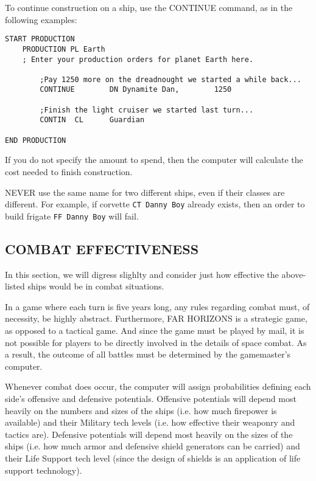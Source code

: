 \documentclass[10pt,titlepage]{article}
\begin{document}
To continue construction on a ship, use the CONTINUE command, as in the
following examples:
\begin{verbatim}
START PRODUCTION
    PRODUCTION PL Earth
    ; Enter your production orders for planet Earth here.

        ;Pay 1250 more on the dreadnought we started a while back...
        CONTINUE        DN Dynamite Dan,        1250

        ;Finish the light cruiser we started last turn...
        CONTIN  CL      Guardian

END PRODUCTION

\end{verbatim}
If you do not specify the amount to spend, then the computer will calculate
the cost needed to finish construction.

NEVER use the same name for two different ships, even if their classes are
different.  For example, if corvette \texttt{CT Danny Boy} already exists, then an
order to build frigate \texttt{FF Danny Boy} will fail.


\subsection{COMBAT EFFECTIVENESS}
\label{sec:combateffectiveness}


In this section, we will digress slighlty and consider just how effective the
above-listed ships would be in combat situations.

In a game where each turn is five years long, any rules regarding combat must,
of necessity, be highly abstract.  Furthermore, FAR HORIZONS is a strategic
game, as opposed to a tactical game.  And since the game must be played by
mail, it is not possible for players to be directly involved in the details of
space combat.  As a result, the outcome of all battles must be determined by
the gamemaster's computer.

Whenever combat does occur, the computer will assign probabilities defining
each side's offensive and defensive potentials.  Offensive potentials will
depend most heavily on the numbers and sizes of the ships (i.e. how much
firepower is available) and their Military tech levels (i.e. how effective
their weaponry and tactics are).  Defensive potentials will depend most heavily
on the sizes of the ships (i.e. how much armor and defensive shield generators
can be carried) and their Life Support tech level (since the design of shields
is an application of life support technology).
\end{document}
